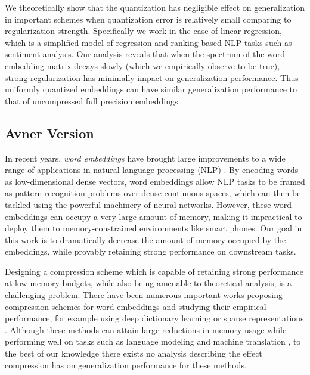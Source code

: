 We theoretically show that the quantization has negligible effect on generalization in important schemes when quantization error is relatively small comparing to regularization strength. Specifically we work in the case of linear regression, which is a simplified model of regression and ranking-based NLP tasks such as sentiment analysis. Our analysis reveals that when the spectrum of the word embedding matrix decays slowly (which we empirically observe to be true), strong regularization has minimally impact on generalization performance. Thus uniformly quantized embeddings can have similar generalization performance to that of uncompressed full precision embeddings.



\subsection{Avner Version}
In recent years, \textit{word embeddings} \citep{word2vec13,glove14,fasttext18} have brought large improvements to a wide range of applications in natural language processing (NLP) \citep{collins16,drqa17}.
By encoding words as low-dimensional dense vectors, word embeddings allow NLP tasks to be framed as pattern recognition problems over dense continuous spaces, which can then be tackled using the powerful machinery of neural networks.
However, these word embeddings can occupy a very large amount of memory, making it impractical to deploy them to memory-constrained environments like smart phones.
Our goal in this work is to dramatically decrease the amount of memory occupied by the embeddings, while provably retaining strong performance on downstream tasks.

Designing a compression scheme which is capable of retaining strong performance at low memory budgets, while also being amenable to theoretical analysis, is a challenging problem.
There have been numerous important works proposing compression schemes for word embeddings and studying their empirical performance, for example using deep dictionary learning or sparse representations \citep{sparse16,andrews16,dccl17}.
Although these methods can attain large reductions in memory usage while performing well on tasks such as language modeling \citep{mikolov10} and machine translation \citep{bahdanau15}, to the best of our knowledge there exists no analysis describing the effect compression has on generalization performance for these methods.


